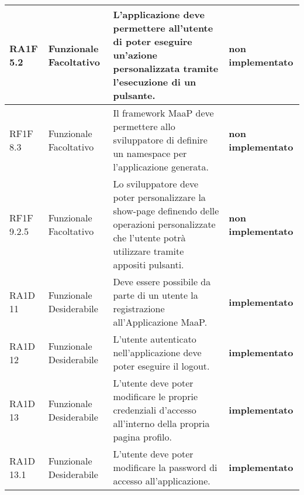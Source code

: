 \begin{longtable}{ | l | p{2cm} | p{5cm} | p{4cm}| }
        RA1F 5.2 & Funzionale \newline  Facoltativo  & L’applicazione deve permettere all’utente di poter eseguire un’azione personalizzata tramite l’esecuzione di un pulsante. & \textbf{{\color{red} non implementato}} \newline  \\ \hline      
             
           
        RF1F 8.3 & Funzionale \newline  Facoltativo  & Il framework MaaP deve permettere allo sviluppatore di definire un namespace per l’applicazione generata. & \textbf{{\color{red} non implementato}} \newline  \\ \hline      
        
          
        RF1F 9.2.5 & Funzionale \newline  Facoltativo  & Lo sviluppatore deve poter personalizzare la show-page definendo delle operazioni personalizzate che l’utente potrà utilizzare tramite appositi pulsanti. & \textbf{{\color{red} non implementato}} \newline  \\ \hline      
          
             
        RA1D 11 & Funzionale \newline  Desiderabile  & Deve essere possibile da parte di un utente la registrazione all’Applicazione MaaP. & \textbf{{\color{green} implementato}} \newline  \\ \hline      
        RA1D 12 & Funzionale \newline  Desiderabile  & L’utente autenticato nell’applicazione deve poter eseguire il logout. & \textbf{{\color{green} implementato}} \newline  \\ \hline      
        RA1D 13 & Funzionale \newline  Desiderabile  & L'utente deve poter modificare le proprie credenziali d'accesso all'interno della propria pagina profilo. & \textbf{{\color{green} implementato}} \newline  \\ \hline      
        RA1D 13.1 & Funzionale \newline  Desiderabile  & L’utente deve poter modificare la password di accesso all’applicazione. & \textbf{{\color{green} implementato}} \newline  \\ \hline      
        

\end{longtable}
